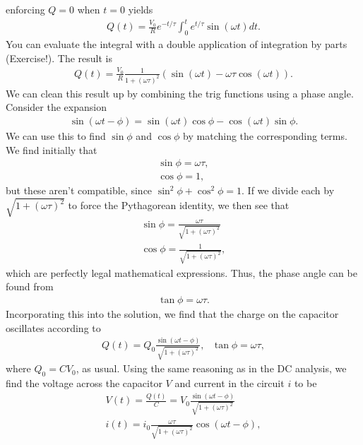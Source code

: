 enforcing $Q=0$ when $t=0$ yields
\begin{eqnarray*}
Q(t) = \frac{V_0}{R} e^{-t/\tau} \int_0^t e^{t/\tau} \sin (\omega t) dt.
\end{eqnarray*}
You can evaluate the integral with a double application of integration by 
parts (Exercise!). The result is
\begin{eqnarray*}
Q(t) = \frac{V_0}{R} \frac{1}{1+(\omega \tau)^2} \left( \sin (\omega t) -
       \omega \tau \cos(\omega t) \right).
\end{eqnarray*}  
We can clean this result up by combining the trig functions using a phase 
angle. Consider the expansion
\begin{eqnarray*}
\sin(\omega t - \phi) = \sin(\omega t) \cos\phi - \cos(\omega t) \sin\phi.
\end{eqnarray*}
We can use this to find $\sin\phi$ and $\cos\phi$ by matching the corresponding
terms. We find initially that
\begin{eqnarray*}
\sin\phi = \omega \tau,\\
\cos\phi = 1,
\end{eqnarray*}
but these aren't compatible, since $\sin^2 \phi + \cos^2 \phi =1$. If we 
divide each by $\sqrt{1+(\omega \tau)^2}$ to force the Pythagorean identity, we
then see that
\begin{eqnarray*}
\sin\phi = \frac{\omega \tau}{\sqrt{1+(\omega \tau)^2}}\\
\cos\phi = \frac{1}{\sqrt{1+(\omega \tau)^2}}, 
\end{eqnarray*}
which are perfectly legal mathematical expressions. Thus, the phase angle can
be found from
\begin{eqnarray}
\tan \phi = \omega \tau.\label{eq:RC:phaseangle}
\end{eqnarray}
Incorporating this into the solution, we find that the charge on the capacitor
oscillates according to
\begin{eqnarray*}
Q(t) = Q_0 \frac{\sin(\omega t - \phi)}{\sqrt{1+(\omega \tau)^2}},
~~~\tan\phi=\omega\tau,    
\end{eqnarray*}
where $Q_0 = CV_0$, as usual. Using the same reasoning as in the DC analysis, 
we find the voltage across the capacitor $V$ and current in the circuit $i$ to 
be
\begin{eqnarray}
V(t) = \frac{Q(t)}{C} = V_0 \frac{\sin(\omega t - \phi)}
        {\sqrt{1+(\omega \tau)^2}}
       \label{eq:RC:oscillatingv}\\
i(t) = i_0\frac{\omega \tau}{\sqrt{1+(\omega \tau)^2}} 
       \cos(\omega t - \phi),
       \nonumber
\end{eqnarray}
